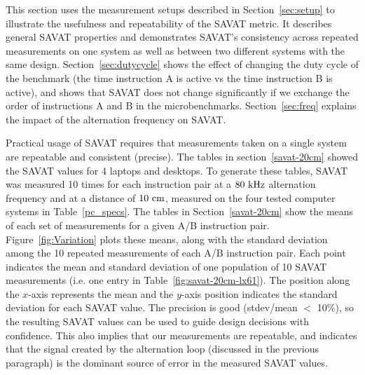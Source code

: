 
This section uses the measurement setups described in Section~\ref{sec:setup} to illustrate the usefulness and repeatability of the SAVAT metric. It describes general SAVAT properties and demonstrates SAVAT's consistency across repeated measurements on one system as well as between two different systems with the same design. Section~\ref{sec:dutycycle} shows the effect of changing the duty cycle of the benchmark (the time instruction A is active vs the time instruction B is active), and shows that SAVAT does not change significantly if we exchange the order of instructions A and B in the microbenchmarks. Section~\ref{sec:freq} explains the impact of the alternation frequency on SAVAT. %

Practical usage of SAVAT requires that measurements taken on a single system are repeatable and consistent (precise). The tables in section~\ref{savat-20cm} showed the SAVAT values for 4 laptops and desktops. To generate these tables, SAVAT was measured 10 times for each instruction pair at a $80~{\rm kHz}$ alternation frequency and at a distance of $10~{\rm cm}$, measured on the four tested computer systems in Table~\ref{pc_specs}. The tables in Section~\ref{savat-20cm} show the means of each set of measurements for a given A/B instruction pair. Figure~\ref{fig:Variation} plots these means, along with the standard deviation among the 10 repeated measurements of each A/B instruction pair. Each point indicates the mean and standard deviation of one population of 10 SAVAT measurements (i.e. one entry in Table~\ref{fig:savat-20cm-lx61}). The position along the $x$-axis represents the mean and the $y$-axis position indicates the standard deviation for each SAVAT value. The precision is good (stdev/mean $<$ 10\%), so the resulting SAVAT values can be used to guide design decisions with confidence. This also implies that our measurements are repeatable, and indicates that the signal created by the alternation loop (discussed in the previous paragraph) is the dominant source of error in the measured SAVAT values.

